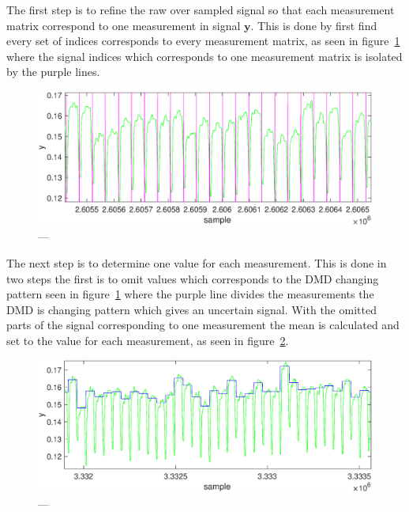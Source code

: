 The first step is to refine the raw over sampled signal so that each measurement matrix correspond to one measurement in signal $\mathbf{y}$. This is done by first find every set of indices corresponds to every measurement matrix, as seen in figure~\ref{fig:raw_signal} where the signal indices which corresponds to one measurement matrix is isolated by the purple lines.


\begin{figure}[H]
\includegraphics[width = 1\linewidth]{gfx/signal_proc/isolated_raw_signal.eps}
\caption{---}
	\label{fig:raw_signal}
\end{figure}

The next step is to determine one value for each measurement. This is done in two steps the first is to omit values which corresponds to the DMD changing pattern seen in figure~\ref{fig:raw_signal} where the purple line divides the measurements the DMD is changing pattern which gives an uncertain signal. With the omitted parts of the signal corresponding to one measurement the mean is calculated and set to the value for each measurement, as seen in figure~\ref{fig:detarmain_signal}. 

\begin{figure}[H]
\includegraphics[width = 1\linewidth]{gfx/signal_proc/isolated_final_signal.eps}
\caption{---}
	\label{fig:detarmain_signal}
\end{figure}

